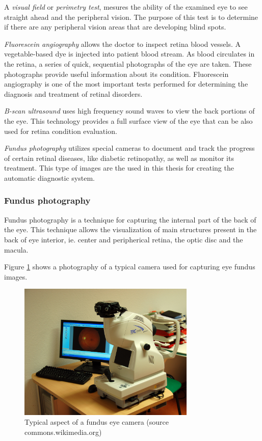 A \emph{visual field} or \emph{perimetry test}, mesures the ability of the examined eye to see straight ahead and the peripheral vision. The purpose of this test is to determine if there are any peripheral vision areas that are developing blind spots.

\emph{Fluorescein angiography} allows the doctor to inspect retina blood vessels. A vegetable-based dye is injected into patient blood stream. As blood circulates in the retina, a series of quick, sequential photographs of the eye are taken. These photographs provide useful information about its condition. Fluorescein angiography is one of the most important tests performed for determining the diagnosis and treatment of retinal disorders.

\emph{B-scan ultrasound} uses high frequency sound waves to view the back portions of the eye. This technology provides a full surface view of the eye that can be also used for retina condition evaluation.

\emph{Fundus photography} utilizes special cameras to document and track the progress of certain retinal diseases, like diabetic retinopathy, as well as monitor its treatment. This type of images are the used in this thesis for creating the automatic diagnostic system.

\subsubsection{Fundus photography}

Fundus photography is a technique for capturing the internal part of the back of the eye. This technique allows the visualization of main structures present in the back of eye interior, ie. center and peripherical retina, the optic disc and the macula.

Figure \ref{back:fig:fundus_camera} shows a photography of a typical camera used for capturing eye fundus images.

\begin{figure}[ht!]
	\centering
	\includegraphics[width=0.75\textwidth]{Figures/chapter_introduction/fundus_camera.jpg}
	\caption[Typical aspect of a fundus eye camera]{Typical aspect of a fundus eye camera (source commons.wikimedia.org)}  
	\label{back:fig:fundus_camera} 
\end{figure}

